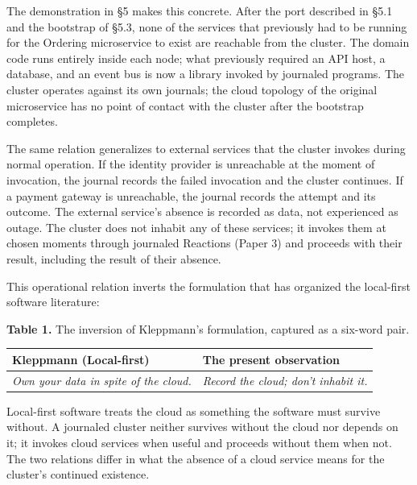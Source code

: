 \documentclass[
]{article}
\newcounter{none} %
\begin{document}
The demonstration in §5 makes this concrete. After the port described in
§5.1 and the bootstrap of §5.3, none of the services that previously had
to be running for the Ordering microservice to exist are reachable from
the cluster. The domain code runs entirely inside each node; what
previously required an API host, a database, and an event bus is now a
library invoked by journaled programs. The cluster operates against its
own journals; the cloud topology of the original microservice has no
point of contact with the cluster after the bootstrap completes.

The same relation generalizes to external services that the cluster
invokes during normal operation. If the identity provider is unreachable
at the moment of invocation, the journal records the failed invocation
and the cluster continues. If a payment gateway is unreachable, the
journal records the attempt and its outcome. The external service's
absence is recorded as data, not experienced as outage. The cluster does
not inhabit any of these services; it invokes them at chosen moments
through journaled Reactions (Paper 3) and proceeds with their result,
including the result of their absence.

This operational relation inverts the formulation that has organized the
local-first software literature:

\textbf{Table 1.} The inversion of Kleppmann's formulation, captured as
a six-word pair.

{\def\LTcaptype{none} %
\begin{longtable}[]{@{}
  >{\raggedright\arraybackslash}p{}
  >{\raggedright\arraybackslash}p{}@{}}
\toprule\noalign{}
\begin{minipage}[b]{\linewidth}\raggedright
Kleppmann (Local-first)
\end{minipage} & \begin{minipage}[b]{\linewidth}\raggedright
The present observation
\end{minipage} \\
\midrule\noalign{}
\endhead
\bottomrule\noalign{}
\endlastfoot
\emph{Own your data in spite of the cloud.} & \emph{Record the cloud;
don't inhabit it.} \\
\end{longtable}
}

Local-first software treats the cloud as something the software must
survive without. A journaled cluster neither survives without the cloud
nor depends on it; it invokes cloud services when useful and proceeds
without them when not. The two relations differ in what the absence of a
cloud service means for the cluster's continued existence.
\end{document}

